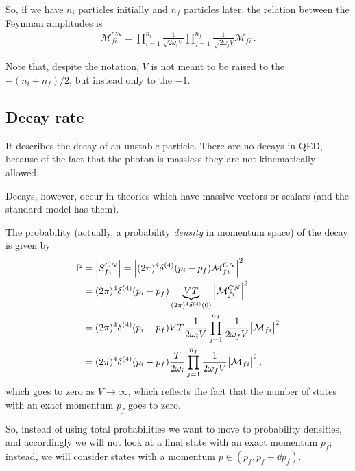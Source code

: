\documentclass[main.tex]{subfiles}
\begin{document}
So, if we have \(n_i\) particles initially and \(n_f\) particles later, the relation between the Feynman amplitudes is 
%
\begin{align}
\mathcal{M}_{fi}^{CN} = \prod_{i=1}^{n_i} \frac{1}{\sqrt{2 \omega_{i}V}}
\prod_{j=1}^{n_f} \frac{1}{\sqrt{2 \omega_{j}V}} \mathcal{M}_{fi}
\,.
\end{align}


Note that, despite the notation, \(V\) is not meant to be raised to the \(- (n_i + n_f) / 2\), but instead only to the \(-1\). 

\subsection{Decay rate}


It describes the decay of an unstable particle. There are no decays in QED, because of the fact that the photon is massless they are not kinematically allowed. 

Decays, however, occur in theories which have massive vectors or scalars (and the standard model has them). 

The probability (actually, a probability \emph{density} in momentum space) of the decay is given by 
%
\begin{align}
\mathbb{P} &= \abs{S^{CN}_{fi}} 
= \abs{(2 \pi )^{4} \delta^{(4)} (p_i - p_f) \mathcal{M}^{CN}_{fi}}^2  \\
&= (2 \pi )^{4} \delta^{(4)} (p_i-p_f) \underbrace{VT}_{(2 \pi )^{4} \delta^{(4)}(0)} \abs{\mathcal{M}_{fi}^{CN}}^2  \\
&=  (2 \pi )^{4} \delta^{(4)} (p_i-p_f) VT \frac{1}{2 \omega_{i} V} \prod_{j=1}^{n_f} \frac{1}{2 \omega_{f} V} \abs{\mathcal{M}_{fi}}^2   \\
&= (2 \pi )^{4} \delta^{(4)} (p_i - p_f) \frac{T}{2 \omega_{i}}
\prod_{j=1}^{n_f} \frac{1}{2 \omega_{f} V} \abs{\mathcal{M}_{fi}}^2
\,,
\end{align}
%
which goes to zero as \(V \to \infty \), which reflects the fact that the number of states with an exact momentum \(p_f\) goes to zero. 

So, instead of using total probabilities we want to move to probability densities, and accordingly we will not look at a final state with an exact momentum \(p_f\); instead, we will consider states with a momentum \(p \in (p_f, p_f + \dd{p_f})\). 
\end{document}
